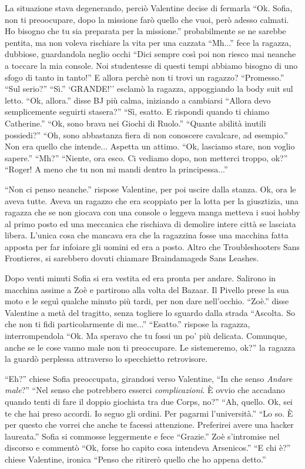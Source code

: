     La situazione stava degenerando, perciò Valentine decise di fermarla ``Ok. Sofia, non ti preoocupare, dopo la
    missione farò quello che vuoi, però adesso calmati. Ho bisogno che tu sia preparata per la missione.''
    probabilmente se ne sarebbe pentita, ma non voleva rischiare la vita per una cazzata ``Mh...'' fece la ragazza,
    dubbiose, guardandola neglio occhi ``Dici sempre così poi non riesco mai neanche a toccare la mia console. Noi
    studentesse di questi tempi abbiamo bisogno di uno sfogo di tanto in tanto!'' E allora perchè non ti trovi un
    ragazzo? ``Promesso.'' ``Sul serio?'' ``Sì.'' `GRANDE!'' esclamò la ragazza, appoggiando la body suit sul letto.
    ``Ok, allora.'' disse BJ più calma, iniziando a cambiarsi ``Allora devo semplicemente seguirti stasera?'' ``Sì,
    esatto. E rispondi quando ti chiamo Catherine.'' ``Ok, sono brava nei Giochi di Ruolo.'' ``Quante abilità inutili
    possiedi?'' ``Oh, sono abbastanza fiera di non conoscere cavalcare, ad esempio.'' Non era quello che intende...
    Aspetta un attimo. ``Ok, lasciamo stare, non voglio sapere.'' ``Mh?'' ``Niente, ora esco. Ci vediamo dopo, non
    metterci troppo, ok?'' ``Roger! A meno che tu non mi mandi dentro la principessa...''

    ``Non ci penso neanche.'' rispose Valentine, per poi uscire dalla stanza. Ok, ora le aveva tutte. Aveva un ragazzo
    che era scoppiato per la lotta per la giusztizia, una ragazza che se non giocava con una console o leggeva manga
    metteva i suoi hobby al primo posto ed una meccanica che rischiava di demolire intere città se lasciata libera.
    L'unica cosa che mancava era che la ragazzina fosse una macchina fatta apposta per far infoiare gli uomini ed era a
    posto. Altro che Troubleshooters Sans Frontieres, si sarebbero dovuti chiamare Braindamageds Sans Leashes.

    Dopo venti minuti Sofia si era vestita ed era pronta per andare. Salirono in macchina assime a Zoè e partirono alla
    volta del Bazaar. Il Pivello prese la sua moto e le seguì qualche minuto più tardi, per non dare nell'occhio.
    ``Zoè.'' disse Valentine a metà del tragitto, senza togliere lo sguardo dalla strada ``Ascolta. So che non ti fidi
    particolarmente di me...'' ``Esatto.'' rispose la ragazza, interrompendola ``Ok. Ma speravo che tu fossi un po' più
    delicata. Comunque, anche se le cose vanno male non ti preoccupare. Le sistemeremo, ok?'' la ragazza la guardò
    perplessa attraverso lo specchietto retrovisore.
    
    ``Eh?'' chiese Sofia preoccupata, girandosi verso Valentine, ``In che senso \emph{Andare male}?'' ``Nel senso che
    potrebbero esserci \emph{complicazioni}. È ovvio che accadano quando tenti di fare il doppio giochista tra due
    Corps, no?'' ``Ah, quello. Ok, sei te che hai preso accordi. Io seguo gli ordini. Per pagarmi l'università.'' ``Lo
    so. È per questo che vorrei che anche te facessi attenzione. Preferirei avere una hacker laureata.'' Sofia si
    commosse leggermente e fece ``Grazie.'' Zoè s'intromise nel discorso e commentò ``Ok, forse ho capito cosa intendeva
    Arsenicos.'' ``E chi è?'' chiese Valentine, ironica ``Penso che ritirerò quello che ho appena detto.''

